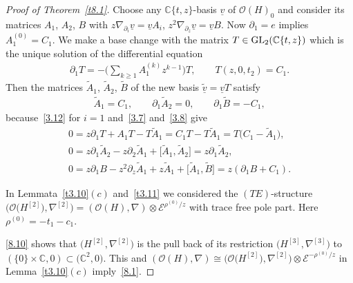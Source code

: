 \documentclass[pdftex]{sigma}%
\numberwithin{equation}{section}
\numberwithin{figure}{section}
\newcommand{\C}{{\mathbb C}}
\newcommand{\EE}{{\mathcal E}}
\newcommand{\OO}{{\mathcal O}}
\newcommand{\www}{\widetilde}
\newcommand{\uuuu}{\underline}
\newcommand{\paa}{\partial}
\newcommand{\nnn}{\nabla}
\begin{document}
\begin{proof}[Proof of Theorem~\ref{t8.1}]
Choose any $\C\{t,z\}$-basis $\uuuu{v}$ of
$\OO(H)_0$ and consider its matrices
$A_1$, $A_2 $, $B$ with $z\nnn_{\paa_i}\uuuu{v}=\uuuu{v}A_i$,
$z^2\nnn_{\paa_z}\uuuu{v}=\uuuu{v}B$.
Now $\paa_1=e$ implies $A_1^{(0)}=C_1$.
We make a base change with the matrix $T\in {\rm GL}_2(\C\{t,z\})$
which is the unique solution of the differential equation
\begin{gather*}
\paa_1 T=-\bigg(\sum_{k\geq 1}A_1^{(k)}z^{k-1}\bigg)T,\qquad
T(z,0,t_2)=C_1.
\end{gather*}
Then the matrices $\www A_1$, $\www A_2$, $\www B$
of the new basis $\uuuu{\www v}=\uuuu{v}T$ satisfy
\begin{gather}\label{8.10}
\www A_1=C_1,\qquad \paa_1\www A_2=0,\qquad \paa_1\www B=-C_1,
\end{gather}
because~\eqref{3.12} for $i=1$ and~\eqref{3.7}
and~\eqref{3.8} give
\begin{gather*}
0= z\paa_1T+A_1T-T\www A_1=C_1T-T\www A_1=T\big(C_1-\www A_1\big),
\\
0= z\paa_1\www A_2-z\paa_2\www A_1+\big[\www A_1,\www A_2\big]= z\paa_1 \www A_2,
\\
0= z\paa_1B-z^2\paa_z\www A_1+z\www A_1+\big[\www A_1,\www B\big]= z(\paa_1B+C_1).
\end{gather*}

In Lemmata~\ref{t3.10}$(c)$ and~\ref{t3.11}
we considered the $(TE)$-structure
$\big(\OO\big(H^{[2]}\big),\nnn^{[2]}\big)=(\OO(H),\nnn)\allowbreak\otimes \EE^{\rho^{(0)}/z}$
with trace free pole part. Here $\rho^{(0)}=-t_1-c_1$.

\eqref{8.10} shows that $\big(H^{[2]},\nnn^{[2]}\big)$ is the pull
back of its restriction $\big(H^{[3]},\nnn^{[3]}\big)$ to
$(\{0\}\times \C,0)\subset \big(\C^2,0\big)$. This and
$(\OO(H),\nnn)\cong \big(\OO\big(H^{[2]}\big),\nnn^{[2]}\big)\otimes
\EE^{-\rho^{(0)}/z}$ in Lemma~\ref{t3.10}$(c)$ imply~\eqref{8.1}.
\end{proof}
\end{document}
